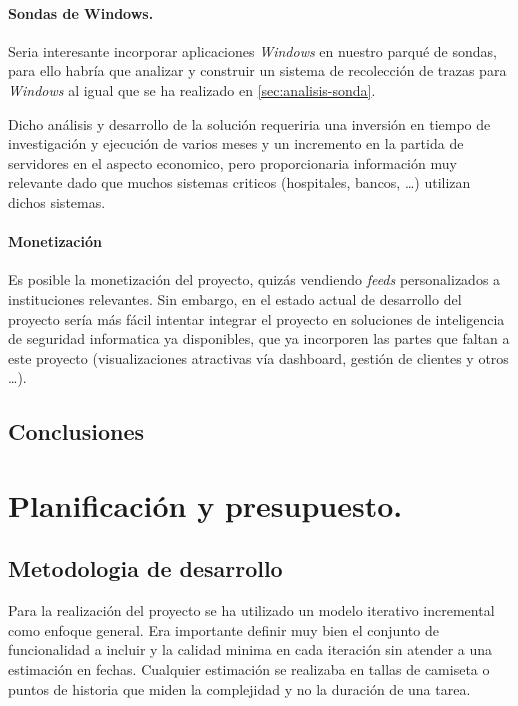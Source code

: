 \subsubsection{Sondas de Windows.}

Seria interesante incorporar aplicaciones \emph{Windows} en nuestro parqué de sondas, para ello habría que analizar y construir un sistema de recolección de trazas
para \emph{Windows} al igual que se ha realizado en \ref{sec:analisis-sonda}.

Dicho análisis y desarrollo de la solución requeriria una inversión en tiempo de investigación y ejecución de varios meses y un incremento en la partida de servidores en el aspecto economico, 
pero proporcionaria información muy relevante dado que muchos sistemas criticos (hospitales, bancos, \ldots) utilizan dichos sistemas.


\subsubsection{Monetización}

Es posible la monetización del proyecto, quizás vendiendo \emph{feeds} personalizados a instituciones relevantes. Sin embargo, en el estado actual de desarrollo del proyecto
sería más fácil intentar integrar el proyecto en soluciones de inteligencia de seguridad informatica ya disponibles, que ya incorporen las partes que faltan a este proyecto
(visualizaciones atractivas vía dashboard, gestión de clientes y otros \ldots).

\section{Conclusiones}




\chapter{Planificación y presupuesto.}
\section{Metodologia de desarrollo}

Para la realización del proyecto se ha utilizado un modelo iterativo incremental como enfoque general. Era importante definir
muy bien el conjunto de funcionalidad a incluir y la calidad minima en cada iteración sin atender a una estimación en fechas. 
Cualquier estimación se realizaba en tallas de camiseta o puntos de historia que miden la complejidad y no la duración de una tarea.

